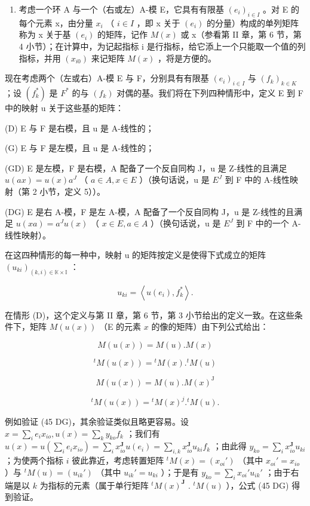 \begin{enumerate}
\def\labelenumi{\Roman{enumi}.}
\setcounter{enumi}{1}
\tightlist
\item
  考虑一个环 A 与一个（右或左）A-模 E，它具有有限基 \((e_{i})_{i\in I}\) 。对 E 的每个元素 x，由分量 \(x_{i}\) （ \(i\in I\) ，即 x 关于 \((e_{i})\) 的分量）构成的单列矩阵称为 x 关于基 \((e_{i})\) 的矩阵，记作 \(M(x)\) 或 x（参看第 II 章，第 6 节，第 4 小节）；在计算中，为记起指标 i 是行指标，给它添上一个只能取一个值的列指标，并用 \((x_{i0})\) 来记矩阵 \(M(x)\) ，将是方便的。
\end{enumerate}

现在考虑两个（左或右）A-模 E 与 F，分别具有有限基 \((e_{i})_{i\in I}\) 与 \((f_{k})_{k\in K}\) ；设 \((f_{k}^{*})\) 是 \(F^{*}\) 的与 \((f_{k})\) 对偶的基。我们将在下列四种情形中，定义 E 到 F 中的映射 u 关于这些基的矩阵：

(D) E 与 F 是右模，且 u 是 A-线性的；

(G) E 与 F 是左模，且 u 是 A-线性的；

(GD) E 是左模，F 是右模，A 配备了一个反自同构 J，u 是 Z-线性的且满足 \(u(ax) = u(x)a^{J}\) （ \(a \in A, x \in E\) ）（换句话说，u 是 \(E^{J}\) 到 F 中的 A-线性映射（第 2 小节，定义 5））。

(DG) E 是右 A-模，F 是左 A-模，A 配备了一个反自同构 J，u 是 Z-线性的且满足 \(u(xa) = a^{J}u(x)\) （ \(x \in E, a \in A\) ）（换句话说，u 是 \(E^{J}\) 到 F 中的一个 A-线性映射）。

在这四种情形的每一种中，映射 u 的矩阵按定义是使得下式成立的矩阵 \((u_{ki})_{(k,i)\in\mathbb{K}\times\mathbb{I}}\) ：

\[
u _ {k i} = \left\langle u (e _ {i}), f _ {k} ^ {*} \right\rangle .\tag{44}
\]

在情形 (D)，这个定义与第 II 章，第 6 节，第 3 小节给出的定义一致。在这些条件下，矩阵 \(M(u(x))\) （E 的元素 \(x\) 的像的矩阵）由下列公式给出：

\[
M (u (x)) = M (u). M (x)\tag{45 D}
\]

\[
{ } ^ { t } M ( u ( x ) ) = { } ^ { t } M ( x ) . { } ^ { t } M ( u )\tag{45 G}
\]

\[
M (u (x)) = M (u). M (x) ^ {\mathrm{J}}\tag{45 GD}
\]

\[
{ } ^ { t } M ( u ( x ) ) = { } ^ { t } M ( x ) ^ { j } . { } ^ { t } M ( u ) .\tag{45 DG}
\]

例如验证 (45 DG)，其余验证类似且略更容易。设 \(x = \sum_{i} e_i x_{io}, u(x) = \sum_{k} y_{ko} f_k\) ；我们有 \(u(x) = u(\sum_{i} e_i x_{io}) = \sum_{i} x_{io}^{\mathbf{J}} u(e_i) = \sum_{i,k} x_{io}^{\mathbf{J}} u_{ki} f_k\) ；由此得 \(y_{ko} = \sum_{i} x_{io}^{\mathbf{J}} u_{ki}\) ；为使两个指标 \(i\) 彼此靠近，考虑转置矩阵 \(^t M(x) = (x_{oi}')\) （其中 \(x_{oi}' = x_{io}\) ）与 \(^t M(u) = (u_{ik}')\) （其中 \(u_{ik}' = u_{ki}\) ）；于是有 \(y_{ko} = \sum_{i} x_{oi}' u_{ik}'\) ；由于右端是以 \(k\) 为指标的元素（属于单行矩阵 \(^t M(x)^{\mathbf{J}}\) . \(^t M(u)\) ），公式 (45 DG) 得到验证。

